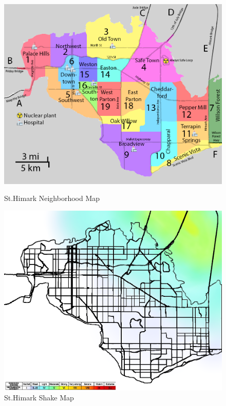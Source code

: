 \documentclass[12pt]{extarticle}
\begin{document}
\begin{figure}[H]
	\centering
	\begin{minipage}{0.5\textwidth}
		\centering
		\includegraphics[width=\textwidth]{Images/map.png}
		\caption{St.Himark Neighborhood Map}
		\label{fig:map}
	\end{minipage}%
	\begin{minipage}{0.5\textwidth}
		\centering
		\includegraphics[width=\textwidth]{Images/shakemap.png}
		\caption{St.Himark Shake Map}
		\label{fig:shakemap}
	\end{minipage}
\end{figure} 
\end{document}
